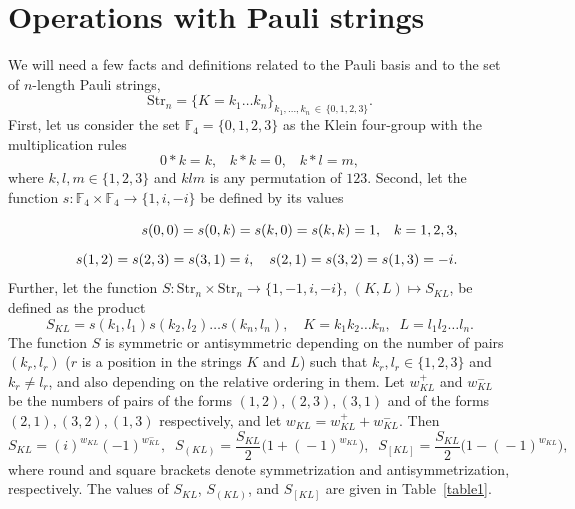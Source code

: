 \documentclass[12pt,a4paper,twoside]{article}      %
\begin{document}
\section{Operations with Pauli strings}
\label{sec4}

We will need a few facts and definitions related to the  Pauli basis and to the set of $n$-length Pauli strings,
\begin{equation}\label{}
\mathrm{Str}_n= \{K=k_1\ldots{}k_n\}_{k_1,\ldots,k_n\,\in\, \{0,1,2,3\}}.
\nonumber
\end{equation}
First, let us consider the set $\mathbb{F}_4=\{0,1,2,3\}$ as the Klein four-group with the multiplication rules
\begin{equation}\label{}
0\!\ast{}\!k=k,\;\;\;k\!\ast{}\!k=0,\;\;\;k\! \ast{}\!l=m,
\nonumber
\end{equation}
where $k,l,m\in\{1,2,3\}$ and $klm$ is any permutation of $123$. Second, let the function $s:\mathbb{F}_4\times\mathbb{F}_4\rightarrow\{1,i,-i\}$ be defined by its values
\begin{eqnarray}\label{}
&&s(0,0)=s(0,k)=s(k,0)=s(k,k)=1,\vphantom{\int} \;\;\; k=1,2,3,
\nonumber \\
&&s(1,2)=s(2,3)=s(3,1)=i,\quad s(2,1)=s(3,2)=s(1,3)=-i.
\nonumber
\end{eqnarray}
Further, let the function $S:\mathrm{Str}_n\times\mathrm{Str}_n\rightarrow \{1,-1,i,-i\}$, $(K,L)\mapsto{}S_{K\!L}$, be defined as the product
\begin{equation}\label{}
S_{K\!L}=s(k_1,l_1)s(k_2,l_2)\ldots{}s(k_n,l_n), \quad K=k_1k_2\ldots{}k_n,\;\; L=l_1l_2\ldots{}l_n.
\nonumber
\end{equation}
The function $S$ is symmetric or antisymmetric depending on the number of pairs $(k_r,l_r)$ ($r$ is a position in the strings $K$ and $L$) such that $k_r,l_r\in\{1,2,3\}$ and $k_r\neq{}l_r$, and also depending on the relative ordering in them. Let $w_{K\!L}^+$ and $w_{K\!L}^-$ be the numbers of pairs of the forms $(1,2),(2,3),(3,1)$ and of the forms $(2,1),(3,2),(1,3)$ respectively, and let $w_{K\!L}=w_{K\!L}^++w_{K\!L}^-$. Then
\begin{equation}\label{SKL}
S_{K\!L}= (i)^{\!w_{K\!L}}(-1)^{\!w^-_{K\!L}},
\;\;
S_{(K\!L)}= \frac{S_{K\!L}}{2}\big(1+(\!-1)^{\!w_{K\!L}}\big),
\;\;
S_{[K\!L]}= \frac{S_{K\!L}}{2}\big(1-(\!-1)^{\!w_{K\!L}}\big),
\end{equation}
where round and square brackets denote symmetrization and antisymmetrization, respectively. The values of $S_{K\!L}$, $S_{(K\!L)}$, and $S_{[K\!L]}$ are given in Table~\ref{table1}.
\end{document}
